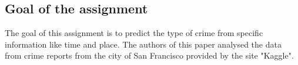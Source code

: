\documentclass[../Main.tex]{subfiles}
\begin{document}
\subsection{Goal of the assignment}
The goal of this assignment is to predict the type of crime from specific information like time and place.
The authors of this paper analysed the data from crime reports from the city of San Francisco provided by the site "Kaggle".
\end{document}
